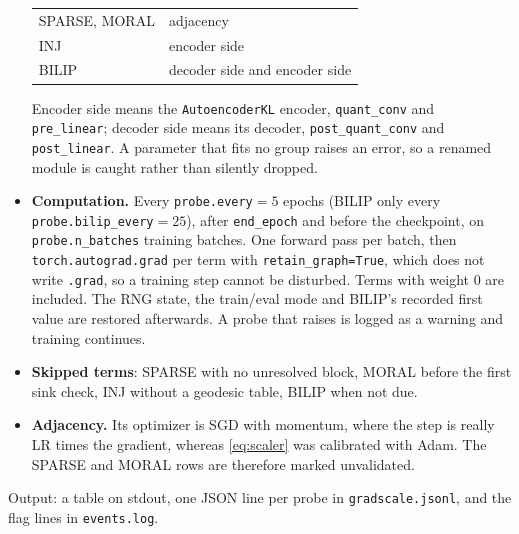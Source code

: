 \begin{itemize}[leftmargin=1.5em]
\begin{center}
\begin{tabular}{@{}ll@{}}
SPARSE, MORAL & adjacency\\
INJ & encoder side\\
BILIP & decoder side and encoder side\\
\bottomrule
\end{tabular}
\end{center}
      Encoder side means the \texttt{AutoencoderKL} encoder, \texttt{quant\_conv} and
      \texttt{pre\_linear}; decoder side means its decoder,
      \texttt{post\_quant\_conv} and \texttt{post\_linear}. A parameter that fits no
      group raises an error, so a renamed module is caught rather than silently
      dropped.
\item \textbf{Computation.} Every \texttt{probe.every}$=5$ epochs (BILIP only every
      \texttt{probe.bilip\_every}$=25$), after \texttt{end\_epoch} and before the
      checkpoint, on \texttt{probe.n\_batches} training batches. One forward pass per
      batch, then \texttt{torch.autograd.grad} per term with
      \texttt{retain\_graph=True}, which does not write \texttt{.grad}, so a training
      step cannot be disturbed. Terms with weight $0$ are included. The RNG state, the
      train/eval mode and BILIP's recorded first value are restored afterwards. A
      probe that raises is logged as a warning and training continues.
\item \textbf{Skipped terms}: SPARSE with no unresolved block, MORAL before the first
      sink check, INJ without a geodesic table, BILIP when not due.
\item \textbf{Adjacency.} Its optimizer is SGD with momentum, where the step is really
      LR times the gradient, whereas \cref{eq:scaler} was calibrated with Adam. The
      SPARSE and MORAL rows are therefore marked unvalidated.
\end{itemize}
Output: a table on stdout, one JSON line per probe in \texttt{gradscale.jsonl}, and
the flag lines in \texttt{events.log}.

